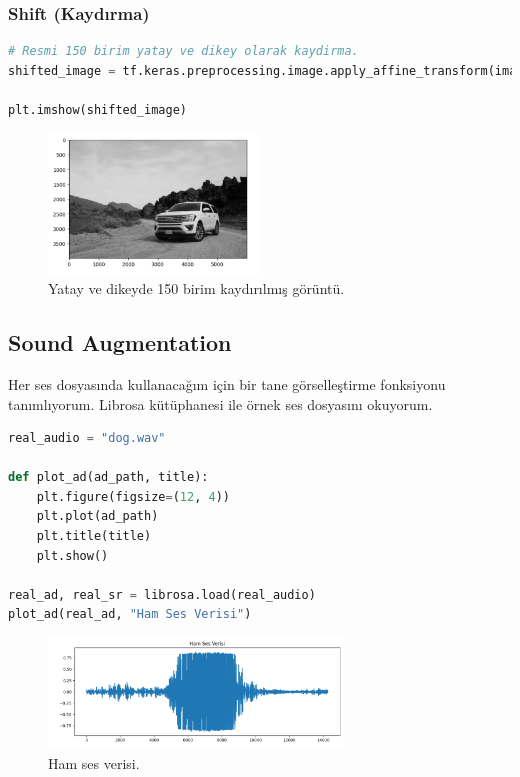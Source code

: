 \subsubsection{Shift (Kaydırma)}

\begin{lstlisting}[language=Python]
# Resmi 150 birim yatay ve dikey olarak kaydirma.
shifted_image = tf.keras.preprocessing.image.apply_affine_transform(image_3, tx=150, ty=150)

plt.imshow(shifted_image)
\end{lstlisting}

\begin{figure}[h]
    \centering
    \includegraphics[width=0.5\textwidth]{images/image_aug_13.png}
    \caption{Yatay ve dikeyde 150 birim kaydırılmış  görüntü.}
    \label{fig:enter-label}
\end{figure}

\newpage

\subsection{Sound Augmentation}
Her ses dosyasında kullanacağım için bir tane görselleştirme fonksiyonu tanımlıyorum. Librosa kütüphanesi ile örnek ses dosyasını okuyorum.

\begin{lstlisting}[language=Python]
real_audio = "dog.wav"

def plot_ad(ad_path, title):
    plt.figure(figsize=(12, 4))
    plt.plot(ad_path)
    plt.title(title)
    plt.show()

real_ad, real_sr = librosa.load(real_audio)
plot_ad(real_ad, "Ham Ses Verisi")
\end{lstlisting}

\begin{figure}[h]
    \centering
    \includegraphics[width=0.7\textwidth]{images/sound_aug_01.png}
    \caption{Ham ses verisi.}
    \label{fig:enter-label}
\end{figure}

